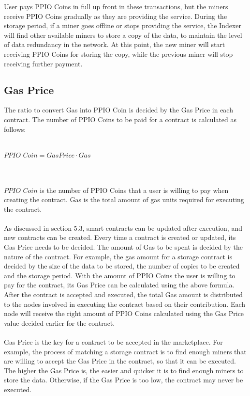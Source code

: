 \documentclass[10pt,a4paper]{article}
\begin{document}
\noindent   
User pays PPIO Coins in full up front in these transactions, but the miners receive PPIO Coins gradually as they are providing the service. During the storage period, if a miner goes offline or stops providing the service, the Indexer will find other available miners to store a copy of the data, to maintain the level of data redundancy in the network. At this point, the new miner will start receiving PPIO Coins for storing the copy, while the previous miner will stop receiving further payment.


      \subsection{Gas Price}  %
The ratio to convert Gas into PPIO Coin is decided by the Gas Price in each contract. The number of PPIO Coins to be paid for a contract is calculated as follows:
 \vspace{-0.5em}
\\ \\ \centerline{$PPIO$ $Coin$$ = GasPrice \cdot Gas$}
 \vspace{-1.5em}
\\ \\$PPIO$ $Coin$ is the number of PPIO Coins that a user is willing to pay when creating the contract. Gas is the total amount of gas units required for executing the contract.
 \vspace{-0.5em}
\\ \\ As discussed in section 5.3, smart contracts can be updated after execution, and new contracts can be created. Every time a contract is created or updated, its Gas Price needs to be decided. The amount of Gas to be spent is decided by the nature of the contract. For example, the gas amount for a storage contract is decided by the size of the data to be stored, the number of copies to be created and the storage period. With the amount of PPIO Coins the user is willing to pay for the contract, its Gas Price can be calculated using the above formula. After the contract is accepted and executed, the total Gas amount is distributed to the nodes involved in executing the contract based on their contribution. Each node will receive the right amount of PPIO Coins calculated using the Gas Price value decided earlier for the contract.
 \vspace{-0.5em}
\\ \\Gas Price is the key for a contract to be accepted in the marketplace. For example, the process of matching a storage contract is to find enough miners that are willing to accept the Gas Price in the contract, so that it can be executed. The higher the Gas Price is, the easier and quicker it is to find enough miners to store the data. Otherwise, if the Gas Price is too low, the contract may never be executed.  
\end{document}
